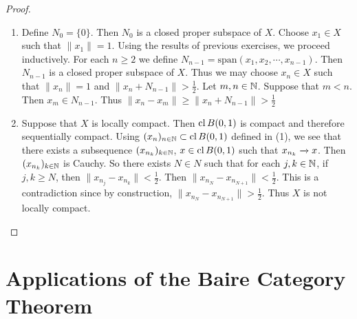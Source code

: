\documentclass{book}
\begin{document}
	\begin{proof}\
		\begin{enumerate}
			\item Define $N_0 = \{0\}$. Then $N_0$ is a closed proper subspace of $X$. Choose $x_1 \in X$ such that $\|x_1 \|= 1$. Using the results of previous exercises, we proceed inductively. For each $n \geq 2$ we define $N_{n-1} = \text{span}(x_1, x_2, \cdots, x_{n-1})$. Then $N_{n-1}$ is a closed proper subspace of $X$. Thus we may choose $x_n \in X$ such that $\|x_n \|= 1$ and $\|x_n + N_{n-1} \|>  \frac{1}{2}$. Let $m,n \in \mathbb{N}$. Suppose that $m<n$. Then $x_m \in N_{n-1}$. Thus $\|x_n - x_m \|\geq \|x_n + N_{n-1} \|> \frac{1}{2}$\vspace{.5cm}\\
			\item Suppose that $X$ is locally compact. Then $\operatorname{cl} B(0,1)$ is compact and therefore sequentially compact. Using $(x_n)_{n \in \mathbb{N}} \subset \operatorname{cl} B(0,1)$ defined in (1), we see that there exists a subsequence $(x_{n_k})_{k \in \mathbb{N}}$, $x \in \operatorname{cl} B(0,1)$ such that $x_{n_k} \xrightarrow{} x$. Then $(x_{n_k})_{k \in \mathbb{N}}$ is Cauchy. So there exists $N \in N$ such that for each $j, k \in \mathbb{N}$, if $j, k \geq N$, then $\|x_{n_j} - x_{n_k} \|< \frac{1}{2}$. Then $\|x_{n_N} - x_{n_{N+1}} \| < \frac{1}{2}$. This is a contradiction since by construction, $\|x_{n_N} - x_{n_{N+1}} \| > \frac{1}{2}$. Thus $X$ is not locally compact.
		\end{enumerate}
	\end{proof}
	
	
	
	
	
	
	
	
	
	
	
	
	
	
	
	
	
	

	
	
	
	
	
	
	
	
	
	
	
	
	
	
	
	
	
	
	
	
	
	
	
	\newpage
	\section{Applications of the Baire Category Theorem} 
	
\end{document}
